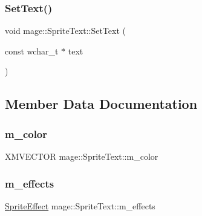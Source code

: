 \hypertarget{classmage_1_1_sprite_text_a03d5012e2812d422a1285a4a0abb104f}{}\label{classmage_1_1_sprite_text_a03d5012e2812d422a1285a4a0abb104f} 
\subsubsection{\texorpdfstring{Set\+Text()}{SetText()}\hspace{0.1cm}{\footnotesize\ttfamily [2/2]}}
{\footnotesize\ttfamily void mage\+::\+Sprite\+Text\+::\+Set\+Text (\begin{DoxyParamCaption}\item[{const wchar\+\_\+t $\ast$}]{text }\end{DoxyParamCaption})}



\subsection{Member Data Documentation}
\hypertarget{classmage_1_1_sprite_text_a200b59aae72c02fda55fafc8e147987a}{}\label{classmage_1_1_sprite_text_a200b59aae72c02fda55fafc8e147987a} 
\subsubsection{\texorpdfstring{m\+\_\+color}{m\_color}}
{\footnotesize\ttfamily X\+M\+V\+E\+C\+T\+OR mage\+::\+Sprite\+Text\+::m\+\_\+color\hspace{0.3cm}{\ttfamily [private]}}

\hypertarget{classmage_1_1_sprite_text_a5fdeb8c2f30482e2c89d892aeb43c50b}{}\label{classmage_1_1_sprite_text_a5fdeb8c2f30482e2c89d892aeb43c50b} 
\subsubsection{\texorpdfstring{m\+\_\+effects}{m\_effects}}
{\footnotesize\ttfamily \hyperlink{namespacemage_a9cfe18123066ba4236f548f9de75d881}{Sprite\+Effect} mage\+::\+Sprite\+Text\+::m\+\_\+effects\hspace{0.3cm}{\ttfamily [private]}}

